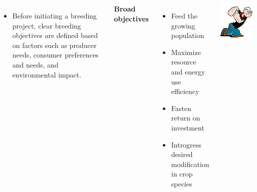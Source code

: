 \documentclass[11pt,ignorenonframetext,aspectratio=169]{beamer}
\providecommand{\tightlist}{%
  \setlength{\itemsep}{0pt}\setlength{\parskip}{0pt}}
\newcommand{\bcolumns}{\begin{columns}[T, onlytextwidth]}
\newcommand{\ecolumns}{\end{columns}}
\begin{document}
\begin{frame}{}
\protect\hypertarget{section-14}{}
\bcolumns
{}

\small

\begin{itemize}
\tightlist
\item
  Before initiating a breeding project, clear breeding objectives are
  defined based on factors such as producer needs, consumer preferences
  and needs, and environmental impact.
\end{itemize}

\textbf{Broad objectives}

\begin{itemize}
\tightlist
\item
  Feed the growing population
\item
  Maximize resource and energy use efficiency
\item
  Fasten return on investment
\item
  Introgress desired modification in crop species
\end{itemize}


\begin{center}\includegraphics[width=0.65\linewidth]{./images/popyae_food_power} \end{center}

\ecolumns
\end{frame}
\end{document}
